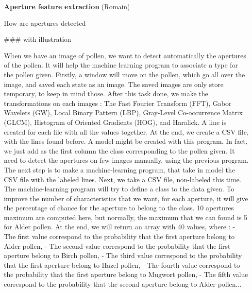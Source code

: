 \textbf{Aperture feature extraction} (Romain)

 How are apertures detected
 
### with illustration

	When we have an image of pollen, we want to detect automatically the apertures of the pollen. It will help the machine learning program to associate a type for the pollen given.
	Firstly, a window will move on the pollen, which go all over the image, and saved each state as an image. The saved images are only store temporary, to keep in mind those. After this task done, we make the transformations on each images : The Fast Fourier Transform (FFT), Gabor Wavelets (GW), Local Binary Pattern (LBP), Gray-Level Co-occurrence Matrix (GLCM), Histogram of Oriented Gradients (HOG), and Haralick. A line is created for each file with all the values together. At the end, we create a CSV file, with the lines found before. A model might be created with this program. In fact, we just add as the first column the class corresponding to the pollen given. It need to detect the apertures on few images manually, using the previous program.
	The next step is to make a machine-learning program, that take in model the CSV file with the labeled lines. Next, we take a CSV file, non-labeled this time. The machine-learning program will try to define a class to the data given. To improve the number of characteristics that we want, for each aperture, it will give the percentage of chance for the aperture to belong to the class. 10 apertures maximum are computed here, but normally, the maximum that we can found is 5 for Alder pollen. At the end, we will return an array with 40 values, where :
- The first value correspond to the probability that the first aperture belong to Alder pollen,
- The second value correspond to the probability that the first aperture belong to Birch pollen,
- The third value correspond to the probability that the first aperture belong to Hazel pollen,
- The fourth value correspond to the probability that the first aperture belong to Mugwort pollen,
- The fifth value correspond to the probability that the second aperture belong to Alder pollen...
    
    